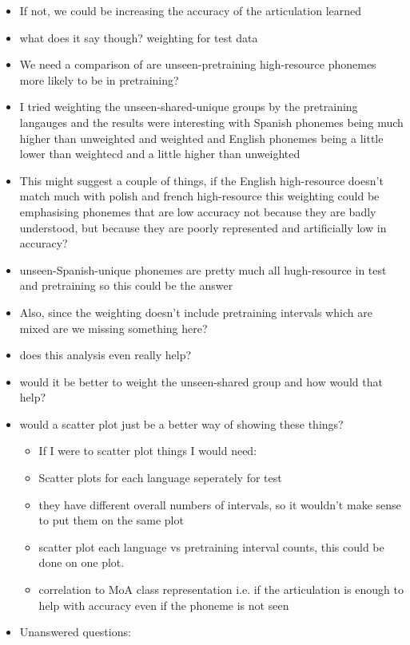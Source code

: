 \begin{itemize}
    \item If not, we could be increasing the accuracy of the articulation learned
    \item what does it say though? weighting for test data
    \item We need a comparison of are unseen-pretraining high-resource phonemes more likely to be in pretraining?
    \item I tried weighting the unseen-shared-unique groups by the pretraining langauges and the results were interesting with Spanish phonemes being much higher than unweighted and weighted and English phonemes being a little lower than weightecd and a little higher than unweighted
    \item This might suggest a couple of things, if the English high-resource doesn't match much with polish and french high-resource this weighting could be emphasising phonemes that are low accuracy not because they are badly understood, but because they are poorly represented and artificially low in accuracy?
    \item unseen-Spanish-unique phonemes are pretty much all hugh-resource in test and pretraining so this could be the answer
    \item Also, since the weighting doesn't include pretraining intervals which are mixed are we missing something here?
    \item does this analysis even really help?
    \item would it be better to weight the unseen-shared group and how would that help?
    \item would a scatter plot just be a better way of showing these things?
    \begin{itemize}
        \item If I were to scatter plot things I would need:
        \item Scatter plots for each language seperately for test
        \item they have different overall numbers of intervals, so it wouldn't make sense to put them on the same plot
        \item scatter plot each language vs pretraining interval counts, this could be done on one plot.
        \item correlation to MoA class representation i.e. if the articulation is enough to help with accuracy even if the phoneme is not seen
    \end{itemize}
    \item Unanswered questions:
    \begin{itemize}

\end{itemize}
\end{itemize}
